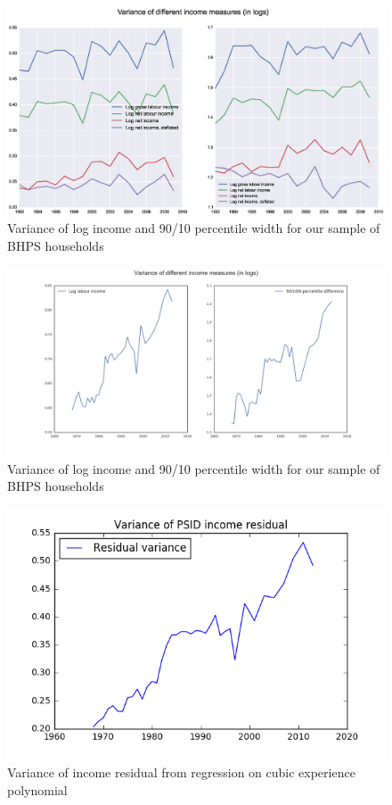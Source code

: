 \begin{figure}
\includegraphics[width=\columnwidth]{BHPS_incvar}
\caption{Variance of log income and 90/10 percentile width for our sample of
BHPS households}
\label{fig:bhps_incvar}
\end{figure}

\begin{figure}
\includegraphics[width=\columnwidth]{PSID_incvar}
\caption{Variance of log income and 90/10 percentile width for our sample of
BHPS households}
\label{fig:psid_incvar}
\end{figure}

\begin{figure}
\includegraphics[width=\columnwidth]{PSID_residual_variance}
\caption{Variance of income residual from regression on cubic experience 
polynomial}
\label{fig:psid_residual_variance}
\end{figure}


